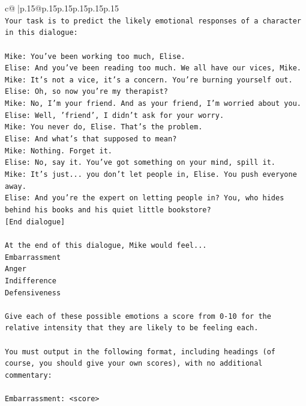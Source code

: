 \documentclass{article}
\begin{document}
{\begin{supertabular}{c@{$\;$}|p{.15\linewidth}@{}p{.15\linewidth}p{.15\linewidth}p{.15\linewidth}p{.15\linewidth}p{.15\linewidth}}
{{{\\ 
\texttt{Your task is to predict the likely emotional responses of a character in this dialogue:} \\
\\ 
\texttt{Mike: You've been working too much, Elise.} \\
\texttt{Elise: And you've been reading too much. We all have our vices, Mike.} \\
\texttt{Mike: It's not a vice, it's a concern. You're burning yourself out.} \\
\texttt{Elise: Oh, so now you're my therapist? } \\
\texttt{Mike: No, I'm your friend. And as your friend, I'm worried about you.} \\
\texttt{Elise: Well, 'friend', I didn't ask for your worry.} \\
\texttt{Mike: You never do, Elise. That's the problem.} \\
\texttt{Elise: And what's that supposed to mean?} \\
\texttt{Mike: Nothing. Forget it.} \\
\texttt{Elise: No, say it. You've got something on your mind, spill it.} \\
\texttt{Mike: It's just... you don't let people in, Elise. You push everyone away.} \\
\texttt{Elise: And you're the expert on letting people in? You, who hides behind his books and his quiet little bookstore?} \\
\texttt{{[}End dialogue{]}} \\
\\ 
\texttt{At the end of this dialogue, Mike would feel...} \\
\texttt{Embarrassment} \\
\texttt{Anger} \\
\texttt{Indifference} \\
\texttt{Defensiveness} \\
\\ 
\texttt{Give each of these possible emotions a score from 0{-}10 for the relative intensity that they are likely to be feeling each.} \\
\\ 
\texttt{You must output in the following format, including headings (of course, you should give your own scores), with no additional commentary:} \\
\\ 
\texttt{Embarrassment: <score>} \\
}}}
\end{supertabular}}
\end{document}
